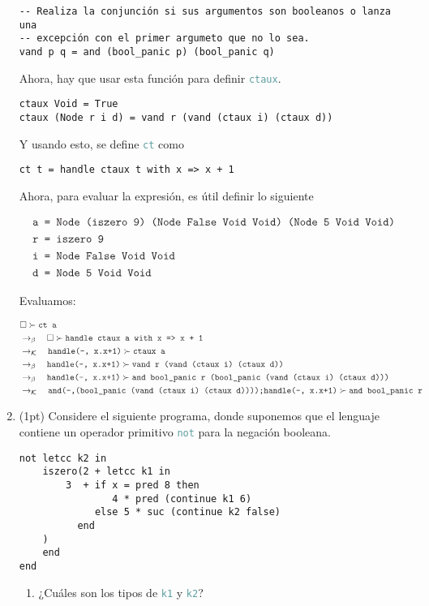 \documentclass{article}
\newcommand{\tx}[1]{\textcolor{Black} {\texttt{#1}}}
\newcommand{\tp}[1]{\textcolor{CadetBlue} {\texttt{#1}}}
\newcommand{\pt}[1]{\textcolor{RoyalPurple}{(#1pt)}}
\newcommand{\es}{$\square$}
\newcommand{\pop}[2]{ \tx{#1} \succ \tx{#2}}
\newcommand{\kr}{\rightarrow_{\mathcal{K}} \quad}
\newcommand{\br}{\rightarrow_{\beta} \quad}
\begin{document}
\begin{enumerate}
\begin{verbatim}
-- Realiza la conjunción si sus argumentos son booleanos o lanza una
-- excepción con el primer argumeto que no lo sea.
vand p q = and (bool_panic p) (bool_panic q)
        \end{verbatim}

        Ahora, hay que usar esta función para definir \tp{ctaux}.

        \begin{verbatim}
ctaux Void = True
ctaux (Node r i d) = vand r (vand (ctaux i) (ctaux d))
        \end{verbatim}

        Y usando esto, se define \tp{ct} como

        \begin{verbatim}
ct t = handle ctaux t with x => x + 1
        \end{verbatim}


		Ahora, para evaluar la expresión, es útil definir lo siguiente
		
		
		\begin{align*}
		&\tx{a = Node (iszero 9) (Node False Void Void) (Node 5 Void Void)} \\
		&\tx{r = iszero 9}\\
		&\tx{i = Node False Void Void}\\
		&\tx{d = Node 5 Void Void}
		\end{align*}

        Evaluamos:
        
        \begin{align*}
        &\pop{\es}{ct a} \\
        &\br \pop{\es}{handle ctaux a with x => x + 1}\\
        &\kr \pop{handle(-, x.x+1)}{ctaux a}\\
        &\br \pop{handle(-, x.x+1)}{vand r (vand (ctaux i) (ctaux d))}\\
        &\br \pop{handle(-, x.x+1)}{and bool\_panic r (bool\_panic (vand (ctaux i) (ctaux d)))}\\
        &\kr \pop{and(-,(bool\_panic (vand (ctaux i) (ctaux d))));handle(-, x.x+1)}{and bool\_panic r }\\
        \end{align*}

        \item \pt{1} Considere el siguiente programa, donde suponemos que el
        lenguaje contiene un operador primitivo \tp{not} para la negación
        booleana.

        \begin{verbatim}
not letcc k2 in
    iszero(2 + letcc k1 in
        3  + if x = pred 8 then
            	4 * pred (continue k1 6)
             else 5 * suc (continue k2 false)
          end
    )
    end
end
        \end{verbatim}
        \begin{enumerate}
            \item ¿Cuáles son los tipos de \tp{k1} y \tp{k2}?


\end{enumerate}
\end{enumerate}
\end{document}
